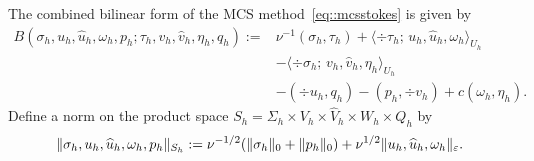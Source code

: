 The combined bilinear form of the MCS method~\eqref{eq::mcsstokes} is given by 
\begin{align*} 
  B(\sigma_h, u_h, \hat{u}_h, \omega_h, p_h; \tau_h, v_h, \hat{v}_h, \eta_h, q_h) := 
  &  \nu^{-1}(\sigma_h, \tau_h)
    + \langle \div\tau_h; \, 
    u_h,\hat u_h, \omega_h \rangle_{U_h}\\
  &- \langle \div\sigma_h;\, v_h,\hat v_h, \eta_h \rangle_{U_h} \\
  & - (\div u_h, q_h) -(p_h, \div v_h) + c(\omega_h, \eta_h).
\end{align*}
Define a  norm on the product space $S_h = \Sigma_h \times
V_h \times \hat V_h \times W_h \times Q_h$ by
\begin{align*}
  \|\sigma_h,  u_h, \widehat{u}_h, \omega_h, p_h\|_{S_h}
  := \nu^{-1/2} ( \|\sigma_h\|_0 + \|p_h\|_0 ) + \nu^{1/2} \|u_h, \widehat{u}_h, \omega_h\|_{\varepsilon}.
\end{align*}



